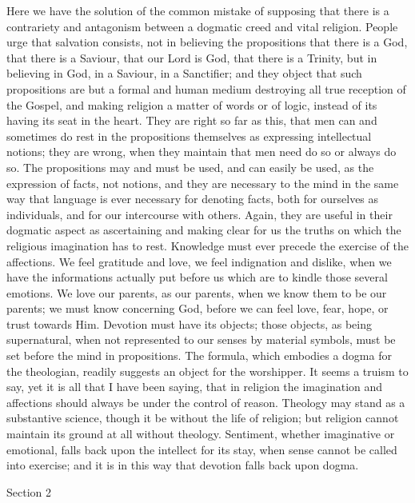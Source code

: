Here we have the solution of the common mistake of supposing that
there is a contrariety and antagonism between a dogmatic creed and
vital religion. People urge that salvation consists, not in believing
the propositions that there is a God, that there is a Saviour, that
our Lord is God, that there is a Trinity, but in believing in God, in
a Saviour, in a Sanctifier; and they object that such propositions are
but a formal and human medium destroying all true reception of the
Gospel, and making religion a matter of words or of logic, instead of
its having its seat in the heart. They are right so far as this, that
men can and sometimes do rest in the propositions themselves as
expressing intellectual notions; they are wrong, when they maintain
that men need do so or always do so. The propositions may and must be
used, and can easily be used, as the expression of facts, not notions,
and they are necessary to the mind in the same way that language is
ever necessary for denoting facts, both for ourselves as individuals,
and for our intercourse with others. Again, they are useful in their
dogmatic aspect as ascertaining and making clear for us the truths on
which the religious imagination has to rest. Knowledge must ever
precede the exercise of the affections. We feel gratitude and love, we
feel indignation and dislike, when we have the informations actually
put before us which are to kindle those several emotions. We love our
parents, as our parents, when we know them to be our parents; we must
know concerning God, before we can feel love, fear, hope, or
trust towards Him. Devotion must have its objects; those objects, as
being supernatural, when not represented to our senses by material
symbols, must be set before the mind in propositions. The formula,
which embodies a dogma for the theologian, readily suggests an object
for the worshipper. It seems a truism to say, yet it is all that I
have been saying, that in religion the imagination and affections
should always be under the control of reason. Theology may stand as a
substantive science, though it be without the life of religion; but
religion cannot maintain its ground at all without theology.
Sentiment, whether imaginative or emotional, falls back upon the
intellect for its stay, when sense cannot be called into exercise; and
it is in this way that devotion falls back upon dogma.

Section 2


